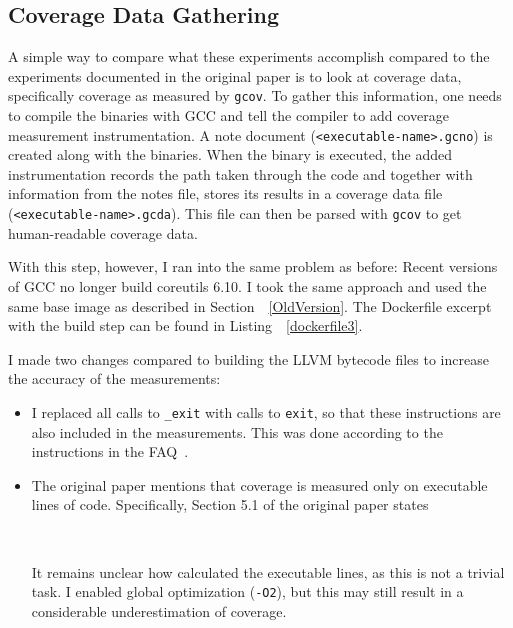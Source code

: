 \documentclass{article}
\let\savedCite=\cite
\renewcommand{\cite}{\unskip~\savedCite}
\let\savedRef=\ref
\renewcommand{\ref}{\unskip~\savedRef}
\begin{document}


\subsection{Coverage Data Gathering}
\label{gcov}

A simple way to compare what these experiments accomplish compared to the experiments documented in the original paper is to look at coverage data, specifically coverage as measured by \lstinline{gcov}. To gather this information, one needs to compile the binaries with GCC and tell the compiler to add coverage measurement instrumentation. A note document (\lstinline{<executable-name>.gcno}) is created along with the binaries. When the binary is executed, the added instrumentation records the path taken through the code and together with information from the notes file, stores its results in a coverage data file (\lstinline{<executable-name>.gcda}). This file can then be parsed with \lstinline{gcov} to get human-readable coverage data.

With this step, however, I ran into the same problem as before: Recent versions of GCC no longer build coreutils 6.10. I took the same approach and used the same base image as described in Section~\ref{OldVersion}. The Dockerfile excerpt with the build step can be found in Listing~\ref{dockerfile3}.



I made two changes compared to building the LLVM bytecode files to increase the accuracy of the measurements:
\begin{itemize}
    \item I replaced all calls to \lstinline{_exit} with calls to \lstinline{exit}, so that these instructions are also included in the measurements. This was done according to the instructions in the FAQ\cite{KLEEFAQ}.
    \item The original paper mentions that coverage is measured only on executable lines of code. Specifically, Section 5.1 of the original paper states
          \begin{displayquote}
              \cite{KLEE}
          \end{displayquote}
          It remains unclear how \citeauthor{KLEE} calculated the executable lines, as this is not a trivial task. I enabled global optimization (\lstinline{-O2}), but this may still result in a considerable underestimation of coverage.
\end{itemize}
\end{document}
